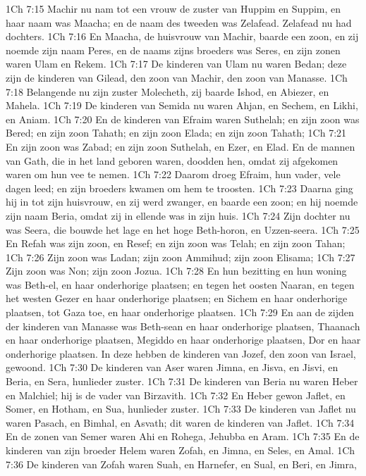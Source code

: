 1Ch 7:15  Machir nu nam tot een vrouw de zuster van Huppim en Suppim, en haar naam was Maacha; en de naam des tweeden was Zelafead. Zelafead nu had dochters.
1Ch 7:16  En Maacha, de huisvrouw van Machir, baarde een zoon, en zij noemde zijn naam Peres, en de naams zijns broeders was Seres, en zijn zonen waren Ulam en Rekem.
1Ch 7:17  De kinderen van Ulam nu waren Bedan; deze zijn de kinderen van Gilead, den zoon van Machir, den zoon van Manasse.
1Ch 7:18  Belangende nu zijn zuster Molecheth, zij baarde Ishod, en Abiezer, en Mahela.
1Ch 7:19  De kinderen van Semida nu waren Ahjan, en Sechem, en Likhi, en Aniam.
1Ch 7:20  En de kinderen van Efraim waren Suthelah; en zijn zoon was Bered; en zijn zoon Tahath; en zijn zoon Elada; en zijn zoon Tahath;
1Ch 7:21  En zijn zoon was Zabad; en zijn zoon Suthelah, en Ezer, en Elad. En de mannen van Gath, die in het land geboren waren, doodden hen, omdat zij afgekomen waren om hun vee te nemen.
1Ch 7:22  Daarom droeg Efraim, hun vader, vele dagen leed; en zijn broeders kwamen om hem te troosten.
1Ch 7:23  Daarna ging hij in tot zijn huisvrouw, en zij werd zwanger, en baarde een zoon; en hij noemde zijn naam Beria, omdat zij in ellende was in zijn huis.
1Ch 7:24  Zijn dochter nu was Seera, die bouwde het lage en het hoge Beth-horon, en Uzzen-seera.
1Ch 7:25  En Refah was zijn zoon, en Resef; en zijn zoon was Telah; en zijn zoon Tahan;
1Ch 7:26  Zijn zoon was Ladan; zijn zoon Ammihud; zijn zoon Elisama;
1Ch 7:27  Zijn zoon was Non; zijn zoon Jozua.
1Ch 7:28  En hun bezitting en hun woning was Beth-el, en haar onderhorige plaatsen; en tegen het oosten Naaran, en tegen het westen Gezer en haar onderhorige plaatsen; en Sichem en haar onderhorige plaatsen, tot Gaza toe, en haar onderhorige plaatsen.
1Ch 7:29  En aan de zijden der kinderen van Manasse was Beth-sean en haar onderhorige plaatsen, Thaanach en haar onderhorige plaatsen, Megiddo en haar onderhorige plaatsen, Dor en haar onderhorige plaatsen. In deze hebben de kinderen van Jozef, den zoon van Israel, gewoond.
1Ch 7:30  De kinderen van Aser waren Jimna, en Jisva, en Jisvi, en Beria, en Sera, hunlieder zuster.
1Ch 7:31  De kinderen van Beria nu waren Heber en Malchiel; hij is de vader van Birzavith.
1Ch 7:32  En Heber gewon Jaflet, en Somer, en Hotham, en Sua, hunlieder zuster.
1Ch 7:33  De kinderen van Jaflet nu waren Pasach, en Bimhal, en Asvath; dit waren de kinderen van Jaflet.
1Ch 7:34  En de zonen van Semer waren Ahi en Rohega, Jehubba en Aram.
1Ch 7:35  En de kinderen van zijn broeder Helem waren Zofah, en Jimna, en Seles, en Amal.
1Ch 7:36  De kinderen van Zofah waren Suah, en Harnefer, en Sual, en Beri, en Jimra,
